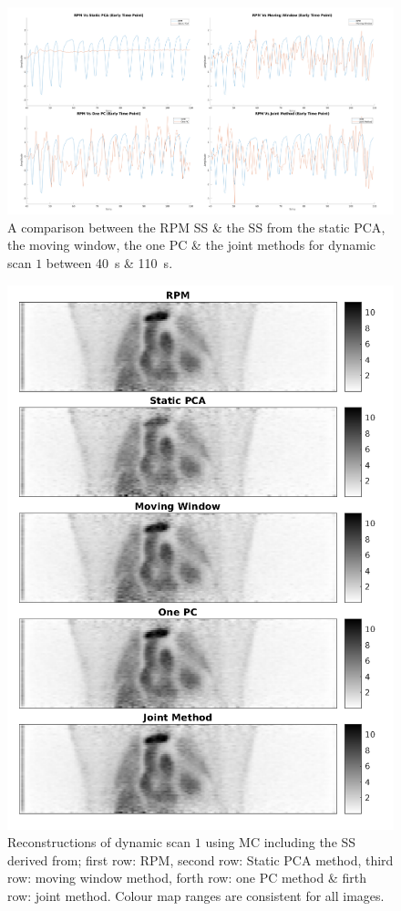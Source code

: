     \begin{figure}
        \centering
        \includegraphics[width=1.0\linewidth]{figures/surrogate_signal.png}
        \captionsetup{singlelinecheck=false, justification=centering}
        \caption{A comparison between the \gls{RPM} \gls{SS} \& the \gls{SS} from the static \gls{PCA}, the moving window, the one \gls{PC} \& the joint methods for dynamic scan $1$ between \SI{40}{\second} \& \SI{110}{\second}.}
        \label{fig:surrogate_signal}
    \end{figure}
    
    \begin{figure}
        \centering
        \includegraphics[width=0.75\linewidth]{figures/visual_analysis_pca.png}
        \captionsetup{singlelinecheck=false, justification=centering}
        \caption{Reconstructions of dynamic scan $1$ using \gls{MC} including the \gls{SS} derived from; first row: \gls{RPM}, second row: Static \gls{PCA} method, third row: moving window method, forth row: one \gls{PC} method \& firth row: joint method. Colour map ranges are consistent for all images.}
        \label{fig:visual_analysis}
    \end{figure}
    
